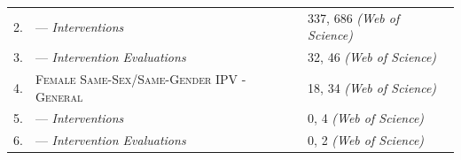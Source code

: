 \documentclass[11pt,]{tufte-book}
\begin{document}
\begin{longtable}[]{@{}lll@{}}
\begin{minipage}[t]{0.03\columnwidth}
2.\strut
\end{minipage} & \begin{minipage}[t]{0.44\columnwidth}\raggedright\strut
--- \textit{Interventions}\strut
\end{minipage} & \begin{minipage}[t]{0.45\columnwidth}\raggedright\strut
337, 686 \textit{\footnotesize{(Web of Science)}}\strut
\end{minipage}\tabularnewline
\begin{minipage}[t]{0.03\columnwidth}\raggedright\strut
3.\strut
\end{minipage} & \begin{minipage}[t]{0.44\columnwidth}\raggedright\strut
--- \textit{Intervention Evaluations}\strut
\end{minipage} & \begin{minipage}[t]{0.45\columnwidth}\raggedright\strut
32, 46 \textit{\footnotesize{(Web of Science)}}\strut
\end{minipage}\tabularnewline
\begin{minipage}[t]{0.03\columnwidth}\raggedright\strut
4.\strut
\end{minipage} & \begin{minipage}[t]{0.44\columnwidth}\raggedright\strut
\textsc{Female Same-Sex/Same-Gender IPV - General}\strut
\end{minipage} & \begin{minipage}[t]{0.45\columnwidth}\raggedright\strut
18, 34 \textit{\footnotesize{(Web of Science)}}\strut
\end{minipage}\tabularnewline
\begin{minipage}[t]{0.03\columnwidth}\raggedright\strut
5.\strut
\end{minipage} & \begin{minipage}[t]{0.44\columnwidth}\raggedright\strut
--- \textit{Interventions}\strut
\end{minipage} & \begin{minipage}[t]{0.45\columnwidth}\raggedright\strut
0, 4 \textit{\footnotesize{(Web of Science)}}\strut
\end{minipage}\tabularnewline
\begin{minipage}[t]{0.03\columnwidth}\raggedright\strut
6.\strut
\end{minipage} & \begin{minipage}[t]{0.44\columnwidth}\raggedright\strut
--- \textit{Intervention Evaluations}\strut
\end{minipage} & \begin{minipage}[t]{0.45\columnwidth}\raggedright\strut
0, 2 \textit{\footnotesize{(Web of Science)}}\strut
\end{minipage}\tabularnewline
\bottomrule
\end{longtable}
\end{document}
